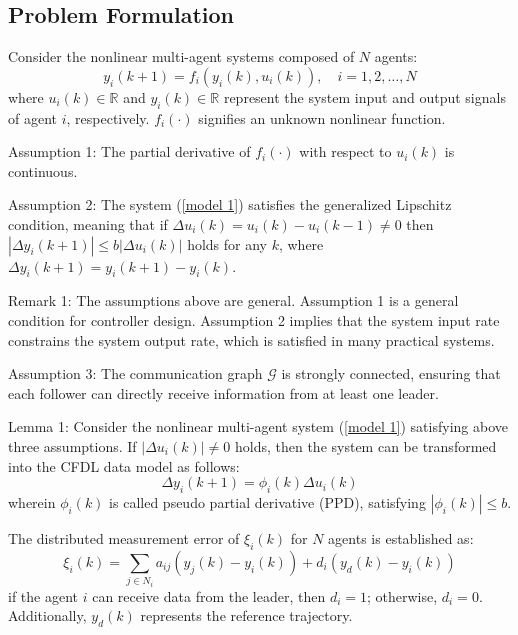 \documentclass[journal,onecolumn]{IEEEtran}
\begin{document}
\subsection{Problem Formulation}

Consider the nonlinear multi-agent systems composed of $ N $ agents:
\begin{equation}
    \label{model 1}
    y_i(k+1) = f_i(y_i(k), u_i(k)), \quad i = 1, 2, \dots, N
\end{equation}
where $u_i(k) \in \mathbb{R}$ and $y_i(k) \in \mathbb{R}$ represent the system input and output signals of agent $ i $, respectively. $f_i(\cdot)$ signifies an unknown nonlinear function.

Assumption 1: The partial derivative of \( f_i(\cdot) \) with respect to \( u_i(k) \) is continuous.

Assumption 2: The system (\ref{model 1}) satisfies the generalized Lipschitz condition, meaning that if \( \Delta u_i(k) = u_i(k) - u_i(k - 1) \neq 0 \) then \( | \Delta y_i(k + 1) | \leq b |\Delta u_i(k)| \) holds for any \( k \), where \( \Delta y_i(k + 1) = y_i(k + 1) - y_i(k) \).
 


Remark 1: The assumptions above are general. Assumption 1 is a general condition for controller design. Assumption 2 implies that the system input rate constrains the system output rate, which is satisfied in many practical systems.

Assumption 3: The communication graph $ \mathcal{G} $ is strongly connected, ensuring that each follower can directly receive information from at least one leader.

Lemma 1\cite{8}: Consider the nonlinear multi-agent system (\ref{model 1}) satisfying above three assumptions. If $ | \Delta u_i(k) | \neq 0 $ holds, then the system can be transformed into the CFDL data model as follows:
\begin{equation}
    \label{model 2}
    \Delta y_i(k+1)=\phi_i(k)\Delta u_i(k)
\end{equation}
wherein \(\phi_i(k)\) is called pseudo partial derivative (PPD), satisfying \( | \phi_i(k) | \leq b\).
 
The distributed measurement error of \(\xi_i(k)\) for $N$ agents is established as:
\begin{equation}
    \label{model 3}
    \xi_i(k) = \sum_{j \in N_i} a_{ij}( y_j(k)-y_i(k)) + d_i(y_d(k) - y_i(k ))
\end{equation}
if the agent $ i $ can receive data from the leader, then $d_i=1$; otherwise, $d_i=0$. Additionally, $y_d(k)$ represents the reference trajectory. 
\end{document}
